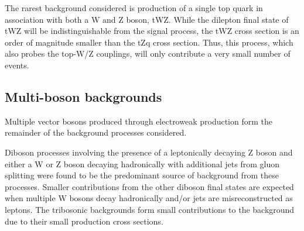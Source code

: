The rarest background considered is production of a single top quark in association with both a W and Z boson, tWZ.
While the dilepton final state of tWZ will be indistinguishable from the signal process, the tWZ cross section is an order of magnitude smaller than the tZq cross section.
Thus, this process, which also probes the top-W/Z couplings, will only contribute a very small number of events.

\subsection{Multi-boson backgrounds}
Multiple vector bosons produced through electroweak production form the remainder of the background processes considered.

Diboson processes involving the presence of a leptonically decaying Z boson and either a W or Z boson decaying hadronically with additional jets from gluon splitting were found to be the predominant source of background from these processes.
Smaller contributions from the other diboson final states are expected when multiple W bosons decay hadronically and/or jets are misreconstructed as leptons.
The tribosonic backgrounds form small contributions to the background due to their small production cross sections.
